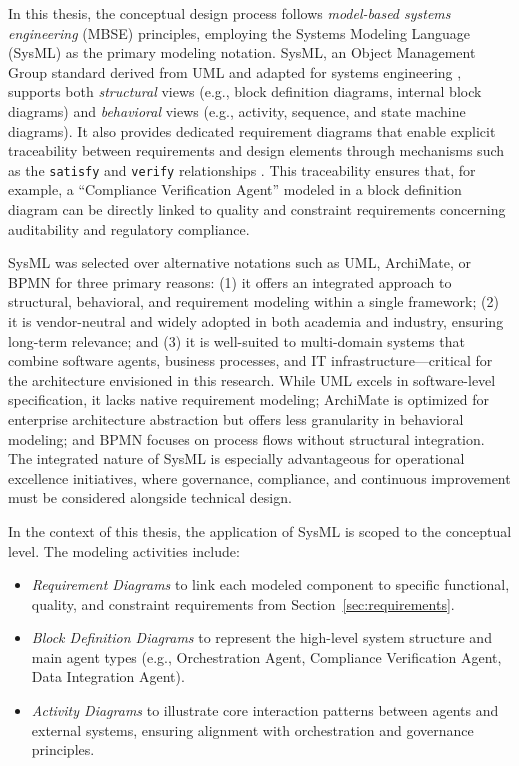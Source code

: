 In this thesis, the conceptual design process follows \emph{model-based systems engineering} (MBSE) principles, employing the Systems Modeling Language (SysML) as the primary modeling notation. SysML, an Object Management Group standard derived from UML and adapted for systems engineering \parencite{omgsysml}, supports both \emph{structural} views (e.g., block definition diagrams, internal block diagrams) and \emph{behavioral} views (e.g., activity, sequence, and state machine diagrams). It also provides dedicated requirement diagrams that enable explicit traceability between requirements and design elements through mechanisms such as the \texttt{\guillemotleft satisfy\guillemotright} and \texttt{\guillemotleft verify\guillemotright} relationships \parencite{friedenthal2014practical}. This traceability ensures that, for example, a ``Compliance Verification Agent'' modeled in a block definition diagram can be directly linked to quality and constraint requirements concerning auditability and regulatory compliance.

SysML was selected over alternative notations such as UML, ArchiMate, or BPMN for three primary reasons: (1) it offers an integrated approach to structural, behavioral, and requirement modeling within a single framework; (2) it is vendor-neutral and widely adopted in both academia and industry, ensuring long-term relevance; and (3) it is well-suited to multi-domain systems that combine software agents, business processes, and IT infrastructure—critical for the architecture envisioned in this research. While UML excels in software-level specification, it lacks native requirement modeling; ArchiMate is optimized for enterprise architecture abstraction but offers less granularity in behavioral modeling; and BPMN focuses on process flows without structural integration. The integrated nature of SysML is especially advantageous for operational excellence initiatives, where governance, compliance, and continuous improvement must be considered alongside technical design.

In the context of this thesis, the application of SysML is scoped to the conceptual level. The modeling activities include:
\begin{itemize}
    \item \emph{Requirement Diagrams} to link each modeled component to specific functional, quality, and constraint requirements from Section~\ref{sec:requirements}.
    \item \emph{Block Definition Diagrams} to represent the high-level system structure and main agent types (e.g., Orchestration Agent, Compliance Verification Agent, Data Integration Agent).
    \item \emph{Activity Diagrams} to illustrate core interaction patterns between agents and external systems, ensuring alignment with orchestration and governance principles.
\end{itemize}

